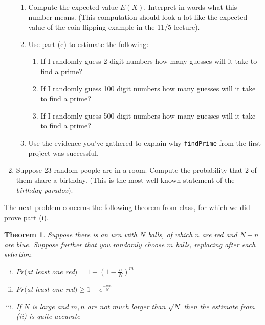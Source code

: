 \documentclass[11pt]{article}
\newtheorem{theorem}{Theorem}
\newcommand{\bZ}{\mathbb{Z}}
\begin{document}
\begin{enumerate}
{\begin{enumerate}
{    \[\Omega = \{n_1,n_2,n_3,\cdots | L\le n_i<U\text{ for all }i\}.\]
    Let $X:\Omega\to\bZ$ be the random variable whose value is number of guesses until the first prime.  That is:
    \[X(n_1n_2n_3...) = i\Longleftrightarrow n_i\text{ is prime and }n_j\text{ is not prime for any }j<i.\]
    Let $a$ be a positive integer.  Compute the probability density $f_X(i)$ in terms of $i$ and the probability $\rho$ from part (a).  (That is, what is the probability that the $i$th number is the first prime?)
    }
    \item{
    Compute the expected value $E(X)$.  Interpret in words what this number means.  (This computation should look a lot like the expected value of the coin flipping example in the 11/5 lecture).
    }
    \item{
    Use part (c) to estimate the following:
    \begin{enumerate}
      \item{If I randomly guess 2 digit numbers how many guesses will it take to find a prime?}
      \item{If I randomly guess 100 digit numbers how many guesses will it take to find a prime?}
      \item{If I randomly guess 500 digit numbers how many guesses will it take to find a prime?}
    \end{enumerate}
    }
    \item{
    Use the evidence you've gathered to explain why \verb|findPrime| from the first project was successful.
    }
  \end{enumerate}
  }
  \item{
  Suppose 23 random people are in a room.  Compute the probability that 2 of them share a birthday.  (This is the most well known statement of the \textit{birthday paradox}).
  }
\end{enumerate}
The next problem concerns the following theorem from class, for which we did prove part (i).
\begin{theorem}\label{collision}
  Suppose there is an urn with $N$ balls, of which $n$ are red and $N-n$ are blue.  Suppose further that you randomly choose $m$ balls, replacing after each selection.
  \begin{enumerate}[(i)]
    \item{
    $Pr($at least one red$) = 1-\left(1-\frac{n}{N}\right)^m$
    }
    \item{
    $Pr($at least one red$) \ge 1-e^{\frac{-mn}{N}}$
    }
    \item{
    If $N$ is large and $m,n$ are not much larger than $\sqrt N$ then the estimate from (ii) is quite accurate
    }
  \end{enumerate}
\end{theorem}
\end{document}
